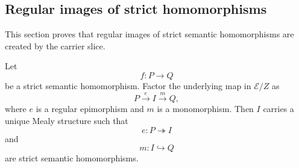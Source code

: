 \subsection{Regular images of strict homomorphisms}
\label{subsec:regular-images-strict-homomorphisms}

This section proves that regular images of strict semantic homomorphisms are
created by the carrier slice.

\begin{proposition}
\label{prop:regular-image-factorization-mealy}
    Let
    \[
        f:P\to Q
    \]
    be a strict semantic homomorphism. Factor the underlying map in
    \(\mathcal E/Z\) as
    \[
        P\xrightarrow{e}I\xrightarrow{m}Q,
    \]
    where \(e\) is a regular epimorphism and \(m\) is a monomorphism. Then \(I\)
    carries a unique Mealy structure such that
    \[
        e:P\twoheadrightarrow I
    \]
    and
    \[
        m:I\hookrightarrow Q
    \]
    are strict semantic homomorphisms.
\end{proposition}

